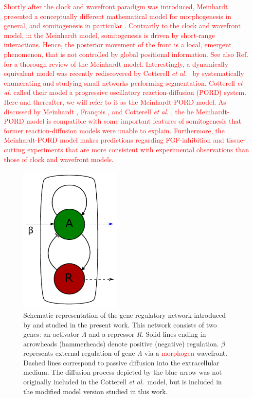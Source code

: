 \documentclass[%
 preprint,
 aip, 
 amsmath,amssymb,
]{revtex4-2}
\begin{document}
\textcolor{red}{Shortly after the clock and wavefront paradigm was introduced, Meinhardt presented a conceptually different mathematical model for morphogenesis in general, and somitogenesis in particular \cite{Meinhardt1982}. Contrarily to the clock and wavefront model, in the Meinhardt model, somitogenesis is driven by short-range interactions. Hence, the posterior movement of the front is a local, emergent phenomenon, that is not controlled by global positional information. See also Ref. \cite{Francois2018} for a thorough review of the Meinhardt model. Interestingly, a dynamically equivalent model was recently rediscovered by Cotterell \emph{et al.}~\cite{Cotterell2015} by systematically enumerating and studying small networks performing segmentation. Cotterell \emph{et al.} called their model a progressive oscillatory reaction-diffusion (PORD) system. Here and thereafter, we will refer to it as the Meinhardt-PORD model. As discussed by Meinhardt \citep{Meinhardt1982}, Fran\c{c}ois \citep{Francois2018}, and Cotterell \emph{et al.} \cite{Cotterell2015}, the he Meinhardt-PORD model is compatible with some important features of somitogenesis that former reaction-diffusion models were unable to explain. Furthermore, the Meinhardt-PORD model makes predictions regarding FGF-inhibition and tissue-cutting experiments that are more consistent with experimental observations than those of clock and wavefront models.}
	
	\begin{figure}[t!]
		\centering
		\includegraphics[width=2in]{Figures/Fig01.pdf}
		\caption{Schematic representation of the gene regulatory network introduced by
			\cite{Cotterell2015} and studied in the present work. This network consists of
			two genes: an activator \textit{A} and a repressor \textit{R}. Solid lines
			ending in arrowheads (hammerheads) denote positive (negative) regulation.
			$\beta$ represents external regulation of gene \textit{A} via a 
			\textcolor{red}{morphogen} wavefront. Dashed lines correspond to passive diffusion into the extracellular
			medium. The diffusion process depicted by the blue arrow was not
			originally included in the Cotterell {\em et al.}~model, but is 
			included in the modified model version studied in this work.}
		\label{Fig01}
	\end{figure}
	
\end{document}
